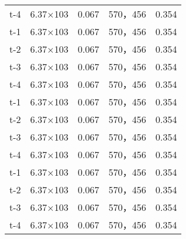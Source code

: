 \begin{longtable}{ccccc}
t-4     &6.37×103       &0.067  &570，456        &0.354\\
t-1     &6.37×103       &0.067  &570，456        &0.354\\
t-2     &6.37×103       &0.067  &570，456        &0.354\\
t-3     &6.37×103       &0.067  &570，456        &0.354\\
t-4     &6.37×103       &0.067  &570，456        &0.354\\
t-1     &6.37×103       &0.067  &570，456        &0.354\\
t-2     &6.37×103       &0.067  &570，456        &0.354\\
t-3     &6.37×103       &0.067  &570，456        &0.354\\
t-4     &6.37×103       &0.067  &570，456        &0.354\\
t-1     &6.37×103       &0.067  &570，456        &0.354\\
t-2     &6.37×103       &0.067  &570，456        &0.354\\
t-3     &6.37×103       &0.067  &570，456        &0.354\\
t-4     &6.37×103       &0.067  &570，456        &0.354\\
\end{longtable}